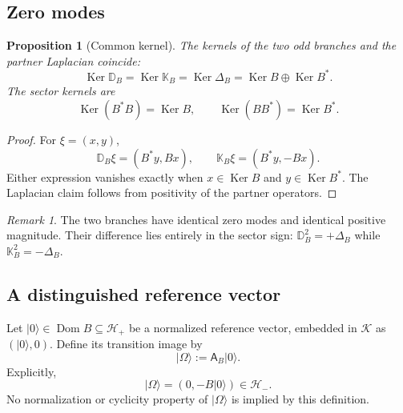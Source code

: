 \documentclass[11pt,reqno]{scrartcl}
\newcommand{\scrK}{\mathscr K}
\newcommand{\scrHp}{\mathscr H_{+}}
\newcommand{\scrHm}{\mathscr H_{-}}
\newcommand{\Aop}{\mathsf A}
\newcommand{\DB}{\mathbb D}
\newcommand{\KB}{\mathbb K}
\newcommand{\DeltaB}{\Delta}
\newcommand{\ket}[1]{\lvert #1\rangle}
\DeclareMathOperator{\Dom}{Dom}
\DeclareMathOperator{\Ker}{Ker}
\theoremstyle{plain}
\newtheorem{proposition}[proposition]{Proposition}
\theoremstyle{definition}
\theoremstyle{remark}
\newtheorem{remark}[remark]{Remark}
\begin{document}
\subsection{Zero modes}

\begin{proposition}[Common kernel]
\label{prop:kernel}
The kernels of the two odd branches and the partner Laplacian coincide:
\begin{equation}
  \boxed{
  \Ker\DB_B
  =\Ker\KB_B
  =\Ker\DeltaB_B
  =\Ker B\oplus\Ker B^*.}
  \label{eq:kernel}
\end{equation}
The sector kernels are
\begin{equation}
  \Ker(B^*B)=\Ker B,
  \qquad
  \Ker(BB^*)=\Ker B^*.
\end{equation}
\end{proposition}

\begin{proof}
For \(\xi=(x,y)\),
\begin{equation}
  \DB_B\xi=(B^*y,Bx),
  \qquad
  \KB_B\xi=(B^*y,-Bx).
\end{equation}
Either expression vanishes exactly when \(x\in\Ker B\) and
\(y\in\Ker B^*\). The Laplacian claim follows from positivity of the partner
operators.
\end{proof}

\begin{remark}
The two branches have identical zero modes and identical positive magnitude.
Their difference lies entirely in the sector sign: \(\DB_B^2=+\DeltaB_B\)
while \(\KB_B^2=-\DeltaB_B\).
\end{remark}

\subsection{A distinguished reference vector}

Let \(\ket0\in\Dom B\subseteq\scrHp\) be a normalized reference vector,
embedded in \(\scrK\) as \((\ket0,0)\). Define its transition image by
\begin{equation}
  \boxed{\ket\Omega:=\Aop_B\ket0.}
  \label{eq:Omega}
\end{equation}
Explicitly,
\begin{equation}
  \ket\Omega=(0,-B\ket0)\in\scrHm.
  \label{eq:Omega-block}
\end{equation}
No normalization or cyclicity property of \(\ket\Omega\) is implied by this
definition.
\end{document}

